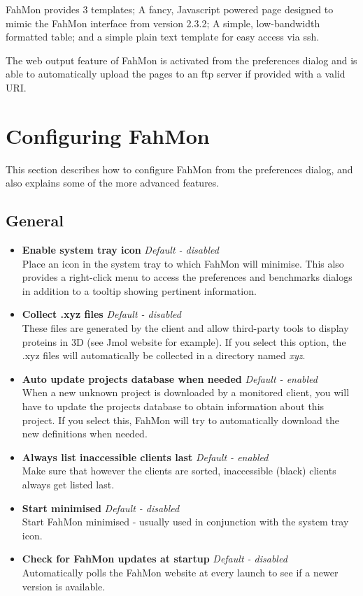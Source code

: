 FahMon provides 3 templates; A fancy, Javascript powered page designed to mimic
the FahMon interface from version 2.3.2; A simple, low-bandwidth formatted
table; and a simple plain text template for easy access via ssh.

The web output feature of FahMon is activated from the preferences dialog and is
able to automatically upload the pages to an ftp server if provided with a valid
URI.

\section{Configuring FahMon}

This section describes how to configure FahMon from the preferences dialog, and
also explains some of the more advanced features.

\subsection{General}
\begin{itemize}
 \item \textbf{Enable system tray icon} \textit{Default - disabled}
  \\Place an icon in the system tray to which FahMon will minimise. This also
   provides a right-click menu to access the preferences and benchmarks dialogs
   in addition to a tooltip showing pertinent information.
 \item \textbf{Collect .xyz files} \textit{Default - disabled}
  \\These files are generated by the client and allow third-party tools to
   display proteins in 3D (see Jmol website for example). If you select this
   option, the .xyz files will automatically be collected in a directory named
   \textit{xyz}.
 \item \textbf{Auto update projects database when needed} \textit{Default -
   enabled}
  \\When a new unknown project is downloaded by a monitored client, you will
   have to update the projects database to obtain information about this
   project. If you select this, FahMon will try to automatically download the
   new definitions when needed.
 \item \textbf{Always list inaccessible clients last} \textit{Default - enabled}
  \\Make sure that however the clients are sorted, inaccessible (black) clients
   always get listed last.
 \item \textbf{Start minimised} \textit{Default - disabled}
  \\Start FahMon minimised - usually used in conjunction with the system tray
   icon.
 \item \textbf{Check for FahMon updates at startup} \textit{Default - disabled}
  \\Automatically polls the FahMon website at every launch to see if a newer
   version is available.
\end{itemize}


